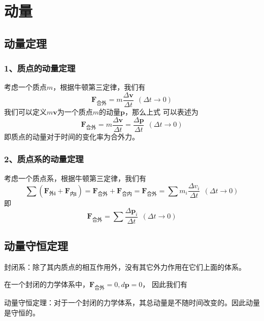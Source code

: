 \section{动量}
\subsection{动量定理}
\subsubsection*{1、质点的动量定理}
考虑一个质点$m$，根据牛顿第三定律，我们有 
\begin{equation}
    \boldsymbol{F_{\text{合外}}}=m\frac{\Delta \boldsymbol{v}}{\Delta t}
    ~~(\Delta t\to 0)
\end{equation}
我们可以定义$m\boldsymbol{v}$为一个质点$m$的动量$\boldsymbol{p}$，那么上式
可以表述为
\begin{equation}
    \boldsymbol{F_{\text{合外}}}=m\frac{\Delta \boldsymbol{v}}{\Delta t}
    =\frac{\Delta \boldsymbol{p}}{\Delta t}~~(\Delta t\to 0)
\end{equation}
即质点的动量对于时间的变化率为合外力。
\subsubsection*{2、质点系的动量定理}
考虑一个质点系，根据牛顿第三定律，我们有 
\begin{equation}
    \sum \left(\boldsymbol{F_{\text{外}i}}+\boldsymbol{F_{\text{内}i}}\right)
    =\boldsymbol{F_{\text{合外}}}+\boldsymbol{F_{\text{合内}}}=
    \boldsymbol{F_{\text{合外}}}=\sum m_i\frac{\Delta v_i}{\Delta t}
    ~~(\Delta t\to 0)
\end{equation}
即 
\begin{equation}
    \boldsymbol{F_{\text{合外}}}=\sum \frac{\Delta \boldsymbol{p}_i}{\Delta t}
    ~~(\Delta t\to 0)
\end{equation}
\subsection{动量守恒定理}
\begin{definition}
    封闭系：除了其内质点的相互作用外，没有其它外力作用在它们上面的体系。
\end{definition}

在一个封闭的力学体系中，$\boldsymbol{F_{\text{合外}}}=0,d\boldsymbol{p}=0$，
因此我们有

\begin{theorem}
    动量守恒定理：对于一个封闭的力学体系，其总动量是不随时间改变的。因此动量是守恒的。
\end{theorem}

